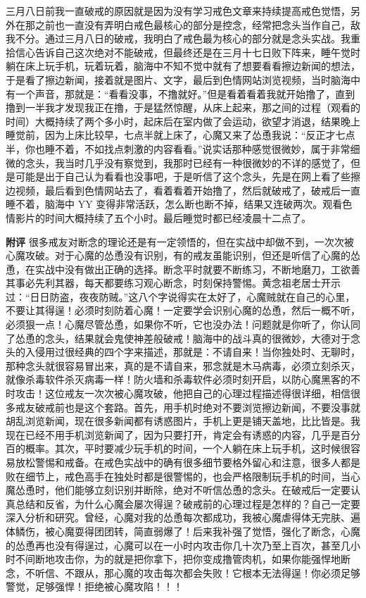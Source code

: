 \begin{case}
    三月八日前我一直破戒的原因就是因为没有学习戒色文章来持续提高戒色觉悟，另外在那之前也一直没有弄明白戒色最核心的部分是控念，经常把念头当作自己，敌我不分。通过三月八日的破戒，我明白了戒色最为核心的部分就是念头实战。我重拾信心告诉自己这次绝对不能破戒，但最终还是在三月十七日败下阵来，睡午觉时躺在床上玩手机，玩着玩着，脑海中不知不觉中就有了想要看看擦边新闻的想法，于是看了擦边新闻，接着就是图片、文字，最后到色情网站浏览视频，当时脑海中有一个声音，那就是：“看看没事，不撸就好。”但是看着看着我就开始撸了，直到撸到一半我才发现我正在撸，于是猛然惊醒，从床上起来，那之间的过程（观看的时间）大概持续了两个多小时，起床后在室内做了会运动，欲望才消退，结果晚上睡觉前，因为上床比较早，七点半就上床了，心魔又来了怂恿我说：“反正才七点半，你也睡不着，不如找点刺激的内容看看。”说实话那种感觉很微妙，属于非常细微的念头，我当时几乎没有察觉到，我那时已经有一种很微妙的不详的感觉了，但是可能是出于自己认为看看也没事吧，于是听信了这个念头，先是在网上看了些擦边视频，最后看到色情网站去了，看着看着开始撸了，然后就破戒了，破戒后一直睡不着，脑海中 YY 变得非常活跃，怎么断也断不掉，结果又连破两次。观看色情影片的时间大概持续了五个小时。最后睡觉时都已经凌晨十二点了。

    \textbf{附评} 很多戒友对断念的理论还是有一定领悟的，但在实战中却做不到，一次次被心魔攻破。对于心魔的怂恿没有识别，有的戒友虽能识别，但还是听信了心魔的怂恿，在实战中没有做出正确的选择。断念平时就要不断练习，不断地磨刀，工欲善其事必先利其器，每天都要练习观心断念，时刻保持警惕。黄念祖老居士开示过：“日日防盗，夜夜防贼。”这八个字说得实在太好了，心魔贼就在自己的心里，不要让其得逞！必须时刻防着心魔！一定要学会识别心魔的怂恿，然后一概不听，必须狠一点！心魔尽管怂恿，如果你不听，它也没办法！问题就是你听了，你认同了怂恿的念头，结果就会鬼使神差般破戒！脑海中的战斗真的很微妙，大德对于念头的入侵用过很经典的四个字来描述，那就是：不请自来！当你独处时、无聊时，那种念头就很容易冒出来，真的是不请自来，邪念就是木马病毒，必须立刻杀灭，就像杀毒软件杀灭病毒一样！防火墙和杀毒软件必须时刻开启，以防心魔黑客的不时攻击！这位戒友一次次被心魔攻破，他把自己的心理过程描述得很详细，相信很多戒友破戒前也是这个套路。首先，用手机时绝对不要浏览擦边新闻，不要没事就胡乱浏览新闻，现在很多新闻都有诱惑图片，手机上更是铺天盖地，比比皆是。我现在已经不用手机浏览新闻了，因为只要打开，肯定会有诱惑的内容，几乎是百分百的概率。其次，平时要减少玩手机的时间，一个人躺在床上玩手机，这时候很容易放松警惕和戒备。在戒色实战中的确有很多细节要格外留心和注意，很多人都是败在细节上，戒色高手在独处时都是很警惕的，也会严格限制玩手机的时间，当心魔怂恿时，他们能够立刻识别并断除，绝对不听信怂恿的念头。在破戒后一定要认真总结和反省，为什么心魔会屡次得逞？破戒前的心理过程是怎样的？自己一定要深入分析和研究。曾经，心魔对我的怂恿每次都成功，我被心魔虐得体无完肤、遍体鳞伤，被心魔耍得团团转，简直弱爆了！后来我补强了觉悟，强化了断念，心魔的怂恿再也没有得逞过，心魔可以在一小时内攻击你几十次乃至上百次，甚至几小时不间断地攻击你，为的就是把你拿下，把你变成撸管肉机，如果你能强悍地断念，不听信、不跟从，那心魔的攻击每次都会失败！它根本无法得逞！你必须足够警觉，足够强悍！拒绝被心魔攻陷！！！
\end{case}

